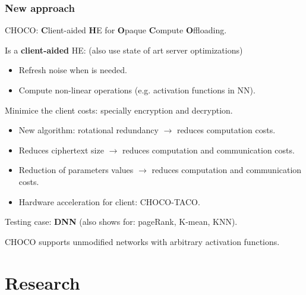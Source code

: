 \documentclass[10pt,handout]{beamer}
\begin{document}
\begin{frame}
\frametitle{New approach}
    \vspace{-0.2cm}
CHOCO: \textbf{C}lient-aided \textbf{H}E for \textbf{O}paque \textbf{C}ompute \textbf{O}ffloading.

    \vspace{-0.2cm}
    Is a \textbf{client-aided} HE: (also use state of art server optimizations)
\pause
    \vspace{-0.4cm}
\begin{itemize}\itemsep-0.7em
    \item Refresh noise when is needed.
    \item Compute non-linear operations (e.g. activation functions in NN).
\end{itemize}

\pause
    Minimice the client costs: specially encryption and decryption.
    \vspace{-0.2cm}
\begin{itemize}\itemsep-0.7em
    \item New algorithm: rotational redundancy $\rightarrow$ reduces computation costs.
    \item Reduces ciphertext size $\rightarrow$ reduces computation and communication costs.
\pause
    \item Reduction of parameters values $\rightarrow$ reduces computation and communication costs.
    \item Hardware acceleration for client: CHOCO-TACO.
\end{itemize}
\pause
    Testing case: \textbf{DNN} (also shows for: pageRank, K-mean, KNN).

    CHOCO supports unmodified networks with arbitrary activation functions.

\end{frame}



\section{Research}
\end{document}
